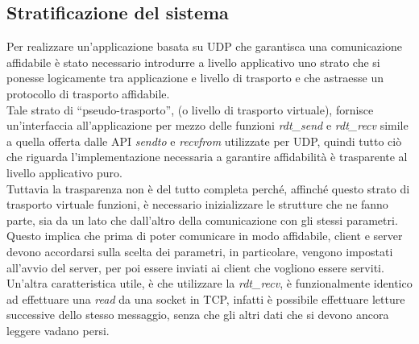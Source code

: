 \subsection{Stratificazione del sistema}
Per realizzare un'applicazione basata su UDP che garantisca una comunicazione 
affidabile è stato necessario introdurre a livello applicativo uno strato che
si ponesse logicamente tra applicazione e livello di trasporto e che astraesse
un protocollo di trasporto affidabile.\\
Tale strato di ``pseudo-trasporto'', (o livello di trasporto virtuale), fornisce un'interfaccia all'applicazione 
per mezzo delle funzioni \emph{rdt\_send} e \emph{rdt\_recv} simile a quella 
offerta dalle API \emph{sendto} e \emph{recvfrom} utilizzate per UDP, 
quindi tutto ciò che riguarda l'implementazione necessaria a garantire 
affidabilità è trasparente al livello applicativo puro.\\
Tuttavia la trasparenza non è del tutto completa perché, affinché questo strato
di trasporto virtuale funzioni, è necessario inizializzare le strutture che ne 
fanno parte, sia da un lato che dall'altro della comunicazione con gli stessi 
parametri. Questo implica che prima di poter comunicare in modo affidabile, 
client e server devono accordarsi sulla scelta dei parametri, in particolare, 
vengono impostati all'avvio del server, per poi essere inviati ai client che 
vogliono essere serviti.\\
Un'altra caratteristica utile, è che utilizzare la \emph{rdt\_recv}, è 
funzionalmente identico ad effettuare una \emph{read} da una socket in TCP, 
infatti è possibile effettuare letture successive dello stesso messaggio, senza 
che gli altri dati che si devono ancora leggere vadano persi. 
